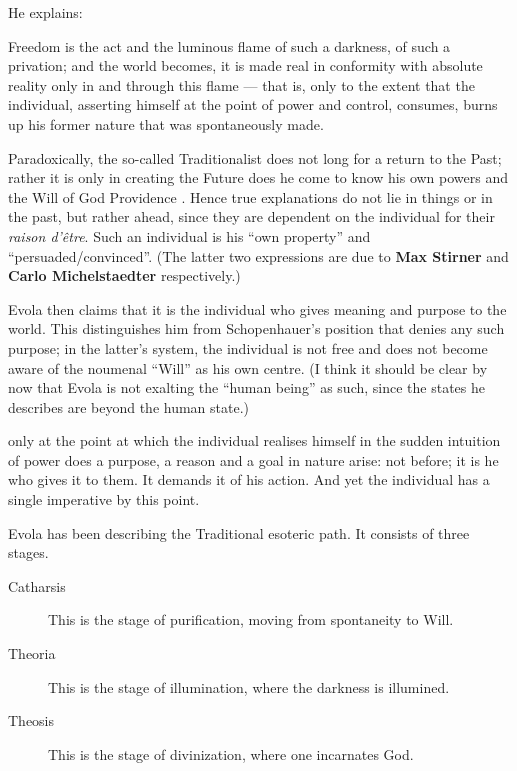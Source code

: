 He explains:

\begin{quotex}
Freedom is the act and the luminous flame of such a darkness, of such a privation; and the world becomes, it is made real in conformity with absolute reality only in and through this flame --- that is, only to the extent that the individual, asserting himself at the point of power and control, consumes, burns up his former nature that was spontaneously made.
\end{quotex}


Paradoxically, the so-called Traditionalist does not long for a return to the Past; rather it is only in creating the Future does he come to know his own powers and the Will of God Providence . Hence true explanations do not lie in things or in the past, but rather ahead, since they are dependent on the individual for their \emph{raison d'être}. Such an individual is his ``own property'' and ``persuaded/convinced''. (The latter two expressions are due to \textbf{Max Stirner} and \textbf{Carlo Michelstaedter} respectively.)


Evola then claims that it is the individual who gives meaning and purpose to the world. This distinguishes him from Schopenhauer's position that denies any such purpose; in the latter's system, the individual is not free and does not become aware of the noumenal ``Will'' as his own centre. (I think it should be clear by now that Evola is not exalting the ``human being'' as such, since the states he describes are beyond the human state.)

\begin{quotex}
only at the point at which the individual realises himself in the sudden intuition of power does a purpose, a reason and a goal in nature arise: not before; it is he who gives it to them. It demands it of his action. And yet the individual has a single imperative by this point.
\end{quotex}


Evola has been describing the Traditional esoteric path. It consists of three stages.

\begin{description}

\item[Catharsis] This is the stage of purification, moving from spontaneity to Will.
\item[Theoria] This is the stage of illumination, where the darkness is illumined.
\item[Theosis] This is the stage of divinization, where one incarnates God.
\end{description}


